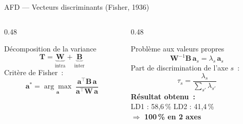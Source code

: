 \documentclass[aspectratio=169, 10pt]{beamer}
\begin{document}
\begin{frame}{AFD — Vecteurs discriminants (Fisher, 1936)}
    \begin{columns}[T]
        \begin{column}{0.48\textwidth}
            \begin{block}{Décomposition de la variance}
                \[
                    \mathbf{T} = \underbrace{\mathbf{W}}_{\text{intra}}
                               + \underbrace{\mathbf{B}}_{\text{inter}}
                \]
                Critère de Fisher~:
                \[
                    \mathbf{a}^* =
                    \underset{\mathbf{a}}{\arg\max}\;
                    \frac{\mathbf{a}^{\top}\mathbf{B}\,\mathbf{a}}
                         {\mathbf{a}^{\top}\mathbf{W}\,\mathbf{a}}
                \]
            \end{block}
        \end{column}
        \begin{column}{0.48\textwidth}
            \begin{block}{Problème aux valeurs propres}
                \[
                    \mathbf{W}^{-1}\mathbf{B}\,\mathbf{a}_s
                    = \lambda_s\,\mathbf{a}_s
                \]
                Part de discrimination de l'axe $s$~:
                \[
                    \tau_s =
                    \frac{\lambda_s}{\sum_{s'} \lambda_{s'}}
                \]
                \vspace{2pt}
                \textbf{Résultat obtenu~:}\\
                LD1 : 58,6\,\% \quad LD2 : 41,4\,\%\\
                $\Rightarrow$ \textbf{100\,\% en 2 axes}
            \end{block}
        \end{column}
    \end{columns}
\end{frame}
\end{document}
